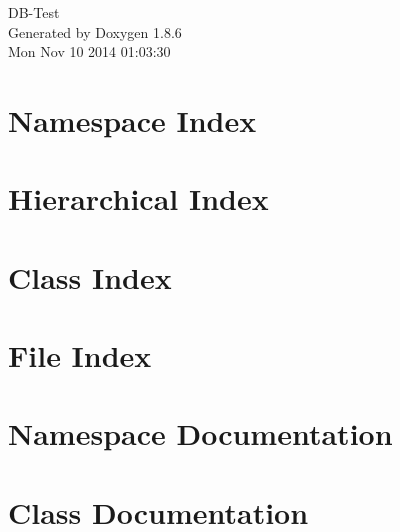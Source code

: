 \documentclass[twoside]{book}
\newcommand{\clearemptydoublepage}{%
  \newpage{\pagestyle{empty}\cleardoublepage}%
}
\begin{document}
\hypersetup{pageanchor=false}
\begin{titlepage}
\vspace*{7cm}
\begin{center}%
{\Large D\-B-\/\-Test }\\
\vspace*{1cm}
{\large Generated by Doxygen 1.8.6}\\
\vspace*{0.5cm}
{\small Mon Nov 10 2014 01:03:30}\\
\end{center}
\end{titlepage}
\clearemptydoublepage
\tableofcontents
\clearemptydoublepage
{}
\hypersetup{pageanchor=true}

\chapter{Namespace Index}

\chapter{Hierarchical Index}

\chapter{Class Index}

\chapter{File Index}

\chapter{Namespace Documentation}


\chapter{Class Documentation}















\end{document}
